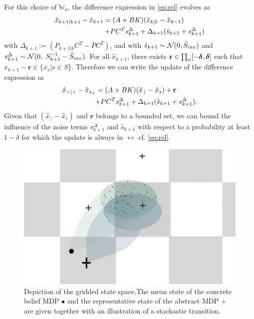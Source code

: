 \documentclass{ifacconf}
\begin{document}
For this choice of  	$\mathbb W_x$, the difference expression in \eqref{eq:rel} evolves   as 
\begin{align}
 \hat x_{k+1|k+1}-	\hat x_{k+1}=(A+BK)(\hat x_{k|k}-\hat x_{k-1})\qquad \quad\notag\\+  \bar P   C^T s^\Delta_{k+1} +\Delta_{k+1}( \hat{s}_{k+1}+ s^\Delta_{k+1})\label{eq:beliefx2}
\end{align}
 with $\Delta_{k+1}:=(P_{k+1|k}C^T-  \bar P   C^T)$, and with $ \hat{s}_{k+1}\sim \CA N (0,\hat{S}_{inv})$ and $ s^\Delta_{k+1}\sim  \CA N (0,\  S_{k+1}^{-1}-\hat{S}_{inv}). $
For all $ \hat x_{k+1}$, there exists $\mathbf  r \in \prod_n[-\grid ,\grid]$ such that   $\hat x_{k+1}-\mathbf r \in \{x_s| s \in S\}$. Therefore we can write the update of the difference expression as  \begin{align}
 \hat x_{+|+}-	\hat x_{s_+}=(A+BK)(\hat x_{\,|\,}-\hat x_s)+\mathbf r\qquad \quad\notag\\+  \bar P   C^T s^\Delta_{k+1} +\Delta_{k+1}( \hat{s}_{k+1}+ s^\Delta_{k+1})\label{eq:beliefx2}.
\end{align}
Given that $(\hat x_{\,|\,}-\hat x_s)$ and  $\mathbf r$ belongs to a bounded set, we can bound the influence of the noise terms $s^\Delta_{k+1}$ and $ \hat{s}_{k+1}$ with respect to a probability at least $1-\delta$ for which the update is always in $\rel$ cf.  \eqref{eq:rel}.

\begin{figure}[htp]
\centering
	\includegraphics[width = .8\columnwidth]{figs/grid}
	\caption{Depiction of the gridded state space.The mean state of the concrete belief MDP $\bullet$ and the  representative state of the abstract MDP $\boldsymbol{+}$ are given together with an illustration of a stochastic transition. }
\end{figure}
\end{document}
